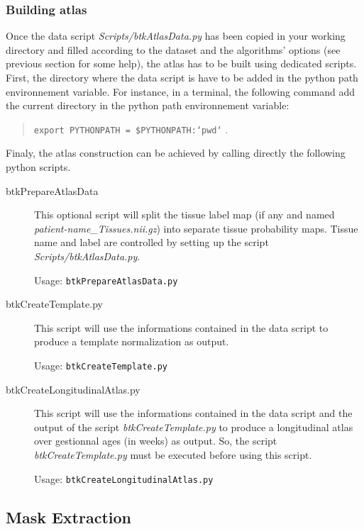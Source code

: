     
    \subsubsection*{Building atlas}

    Once the data script \emph{Scripts/btkAtlasData.py} has been copied in your working directory and filled according to the dataset and the algorithms' options (see previous section for some help), the atlas has to be built using dedicated scripts. First, the directory where the data script is have to be added in the python path environnement variable. For instance, in a terminal, the following command add the current directory in the python path environnement variable:
        \begin{quote}
            \texttt{export PYTHONPATH = \$PYTHONPATH:`pwd`} \enspace .
        \end{quote}
    Finaly, the atlas construction can be achieved by calling directly the following python scripts.

    \begin{description}
        \item[btkPrepareAtlasData] This optional script will split the tissue label map (if any and named \emph{patient-name\_Tissues.nii.gz}) into separate tissue probability maps. Tissue name and label are controlled by setting up the script \emph{Scripts/btkAtlasData.py}.

        Usage: \texttt{btkPrepareAtlasData.py}

        \item[btkCreateTemplate.py] This script will use the informations contained in the data script to produce a template normalization as output.

        Usage: \texttt{btkCreateTemplate.py}

        \item[btkCreateLongitudinalAtlas.py] This script will use the informations contained in the data script and the output of the script \emph{btkCreateTemplate.py} to produce a longitudinal atlas over gestionnal ages (in weeks) as output. So, the script \emph{btkCreateTemplate.py} must be executed before using this script.

        Usage: \texttt{btkCreateLongitudinalAtlas.py}
    \end{description}

\subsection{Mask Extraction}
\label{subsec:Mask}

